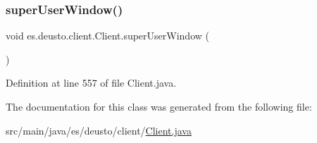 \subsubsection{\texorpdfstring{super\+User\+Window()}{superUserWindow()}}
{\footnotesize\ttfamily void es.\+deusto.\+client.\+Client.\+super\+User\+Window (\begin{DoxyParamCaption}{ }\end{DoxyParamCaption})}



Definition at line 557 of file Client.\+java.



The documentation for this class was generated from the following file\+:\begin{DoxyCompactItemize}
\item 
src/main/java/es/deusto/client/\hyperlink{_client_8java}{Client.\+java}\end{DoxyCompactItemize}
